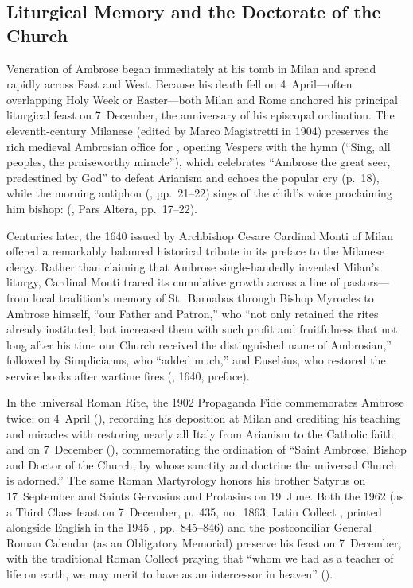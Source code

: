 \subsection{Liturgical Memory and the Doctorate of the Church}

Veneration of Ambrose began immediately at his tomb in Milan and spread rapidly across East and West. Because his death fell on 4~April---often overlapping Holy Week or Easter---both Milan and Rome anchored his principal liturgical feast on 7~December, the anniversary of his episcopal ordination. The eleventh-century Milanese  (edited by Marco Magistretti in 1904) preserves the rich medieval Ambrosian office for , opening Vespers with the hymn  (``Sing, all peoples, the praiseworthy miracle''), which celebrates ``Ambrose the great seer, predestined by God'' to defeat Arianism and echoes the popular cry  (p.~18), while the morning antiphon (, pp.~21--22) sings of the child's voice proclaiming him bishop:  (, Pars Altera, pp.~17--22).

Centuries later, the 1640  issued by Archbishop Cesare Cardinal Monti of Milan offered a remarkably balanced historical tribute in its preface to the Milanese clergy. Rather than claiming that Ambrose single-handedly invented Milan's liturgy, Cardinal Monti traced its cumulative growth across a line of pastors---from local tradition's memory of St.~Barnabas through Bishop Myrocles to Ambrose himself, ``our Father and Patron,'' who ``not only retained the rites already instituted, but increased them with such profit and fruitfulness that not long after his time our Church received the distinguished name of Ambrosian,'' followed by Simplicianus, who ``added much,'' and Eusebius, who restored the service books after wartime fires (, 1640, preface).

In the universal Roman Rite, the 1902 Propaganda Fide  commemorates Ambrose twice: on 4~April (), recording his deposition at Milan and crediting his teaching and miracles with restoring nearly all Italy from Arianism to the Catholic faith; and on 7~December (), commemorating the ordination of ``Saint Ambrose, Bishop and Doctor of the Church, by whose sanctity and doctrine the universal Church is adorned.'' The same Roman Martyrology honors his brother Satyrus on 17~September and Saints Gervasius and Protasius on 19~June. Both the 1962  (as a Third Class feast on 7~December, p.~435, no.~1863; Latin Collect , printed alongside English in the 1945 , pp.~845--846) and the postconciliar General Roman Calendar (as an Obligatory Memorial) preserve his feast on 7~December, with the traditional Roman Collect praying that ``whom we had as a teacher of life on earth, we may merit to have as an intercessor in heaven'' ().

